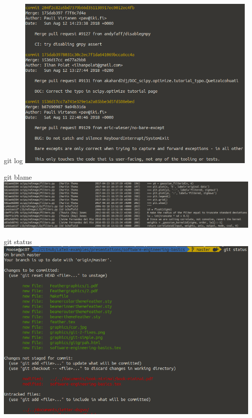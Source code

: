 \documentclass{beamer}
\begin{document}
\begin{frame}{git log}
    \includegraphics[width=0.9\textwidth]{graphics/git-log.png}
\end{frame}

\begin{frame}{git blame}
    \includegraphics[width=1.0\textwidth]{graphics/git-blame.png}
\end{frame}

\begin{frame}{git status}
    \includegraphics[width=1.0\textwidth]{graphics/git-status.png}
\end{frame}
\end{document}
